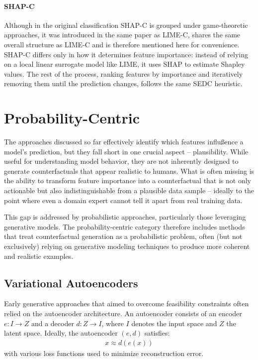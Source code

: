 \begin{methodparagraph}
    \paragraph{SHAP-C} Although in the original classification SHAP-C is grouped under game-theoretic approaches,
    it was introduced in the same paper as LIME-C, shares the same overall structure as LIME-C and is therefore mentioned here for convenience.
    SHAP-C differs only in how it determines feature importance: instead of relying on a local linear surrogate model like LIME,
    it uses SHAP \cite{lundberg2017unified} to estimate Shapley values.
    The rest of the process, ranking features by importance and iteratively removing them until the prediction changes,
    follows the same SEDC heuristic.
\end{methodparagraph}

\section{Probability-Centric}

The approaches discussed so far effectively identify which features influßence a model's prediction,
but they fall short in one crucial aspect -- plausibility. While useful for understanding model behavior,
they are not inherently designed to generate counterfactuals that appear realistic to humans. What is often missing is the ability to transform feature importance into a counterfactual that is not only actionable
but also indistinguishable from a plausible data sample -- ideally to the point where even a domain expert cannot tell it apart from real training data.

This gap is addressed by probabilistic approaches, particularly those leveraging generative models.
The probability-centric category therefore includes methods that treat counterfactual generation as a probabilistic problem,
often (but not exclusively) relying on generative modeling techniques to produce more coherent and realistic examples.

\subsection{Variational Autoencoders}

Early generative approaches that aimed to overcome feasibility constraints often relied on the autoencoder architecture.
An autoencoder consists of an encoder $e : I \to Z$ and a decoder $d : Z \to I$, where $I$ denotes the input space and $Z$ the latent space. Ideally, the autoencoder $(e,d)$ satisfies:
\begin{align}
    x \approx d(e(x))
\end{align}
with various loss functions used to minimize reconstruction error.

